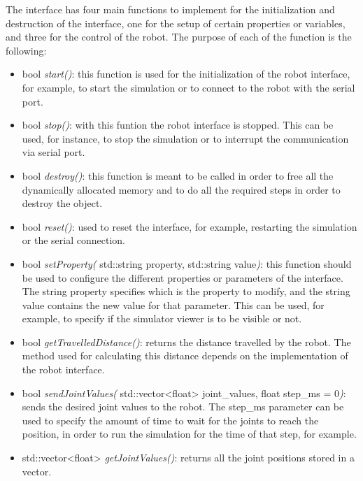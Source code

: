 The interface has four main functions to implement for the initialization and destruction of the interface, one for the setup of certain properties or variables, and three for the control of the robot. The purpose of each of the function is the following:

\begin{itemize}
	\item bool \emph{start()}: this function is used for the initialization of the robot interface, for example, to start the simulation or to connect to the robot with the serial port.
	
	\item bool \emph{stop()}: with this funtion the robot interface is stopped. This can be used, for instance, to stop the simulation or to interrupt the communication via serial port.
	
	\item bool \emph{destroy()}: this function is meant to be called in order to free all the dynamically allocated memory and to do all the required steps in order to destroy the object.
	
	\item bool \emph{reset()}: used to reset the interface, for example, restarting the simulation or the serial connection.
	
	\item bool \emph{setProperty(} std::string property, std::string value\emph{)}: this function should be used to configure the different properties or parameters of the interface. The string property specifies which is the property to modify, and the string value contains the new value for that parameter. This can be used, for example, to specify if the simulator viewer is to be visible or not.
	
	\item bool \emph{getTravelledDistance()}: returns the distance travelled by the robot. The method used for calculating this distance depends on the implementation of the robot interface.
	
	\item bool \emph{sendJointValues(} std::vector<float> joint\_values, float step\_ms = 0\emph{)}: sends the desired joint values to the robot. The step\_ms parameter can be used to specify the amount of time to wait for the joints to reach the position, in order to run the simulation for the time of that step, for example.
	
	\item std::vector<float> \emph{getJointValues()}: returns all the joint positions stored in a vector.
\end{itemize}

